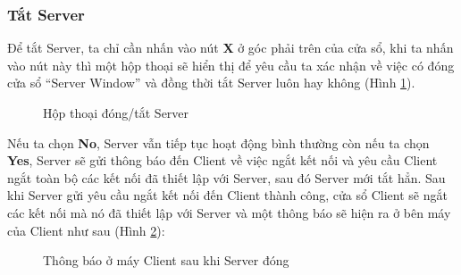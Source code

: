 \subsubsection{Tắt Server}
Để tắt Server, ta chỉ cần nhấn vào nút \textbf{X} ở góc phải trên của cửa sổ, khi ta nhấn vào nút này thì một hộp thoại sẽ hiển thị để yêu cầu ta xác nhận về việc có đóng cửa sổ ``Server Window'' và đồng thời tắt Server luôn hay không (Hình \ref{fig:ServerClosingDialog}). 

\begin{figure}[H]
	\caption{Hộp thoại đóng/tắt Server}
	\label{fig:ServerClosingDialog}
\end{figure}

Nếu ta chọn \textbf{No}, Server vẫn tiếp tục hoạt động bình thường còn nếu ta chọn \textbf{Yes}, Server sẽ gửi thông báo đến Client về việc ngắt kết nối và yêu cầu Client ngắt toàn bộ các kết nối đã thiết lập với Server, sau đó Server mới tắt hẳn. Sau khi Server gửi yêu cầu ngắt kết nối đến Client thành công, cửa sổ Client sẽ ngắt các kết nối mà nó đã thiết lập với Server và một thông báo sẽ hiện ra ở bên máy của Client như sau (Hình \ref{fig:DisconnectedFromServer}):

\begin{figure}[H]
	\caption{Thông báo ở máy Client sau khi Server đóng}
	\label{fig:DisconnectedFromServer}
\end{figure}

